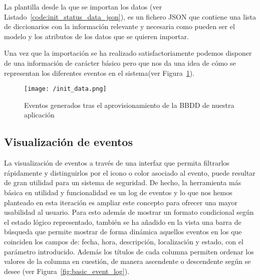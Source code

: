 La plantilla desde la que se importan los datos (ver Listado~\ref{code:init_status_data_json}), es un fichero \acs{JSON} que contiene una lista de diccionarios con la información relevante y necesaria como pueden ser el modelo y los atributos de los datos que se quieren importar. 

Una vez que la importación se ha realizado satisfactoriamente podemos disponer de una información de carácter básico pero que nos da una idea de cómo se representan los diferentes eventos en el sistema(ver Figura~\ref{fig:init_data}).

\begin{figure}[h]
\centering
\texttt{[image: /init\_data.png]}
\caption{Eventos generados tras el aprovisionamiento de la \acs{BBDD} de nuestra aplicación}
\label{fig:init_data}
\end{figure}



\hfill \linebreak



\subsection{Visualización de eventos}

La visualización de eventos a través de una interfaz que permita filtrarlos rápidamente y distinguirlos por el icono o color asociado al evento, puede resultar de gran utilidad para un sistema de seguridad. De hecho, la herramienta más básica en utilidad y funcionalidad es un log de eventos y lo que nos hemos planteado en esta iteración es ampliar este concepto para ofrecer una mayor usabilidad al usuario. Para esto además de mostrar un formato condicional según el estado lógico representado, también se ha añadido en la vista una barra de búsqueda que permite mostrar de forma dinámica aquellos eventos en los que coinciden los campos de: fecha, hora, descripción, localización y estado, con el parámetro introducido. Además los títulos de cada columna permiten ordenar los valores de la columna en cuestión, de manera ascendente o descendente según se desee (ver Figura~\ref{fig:basic_event_log}).

